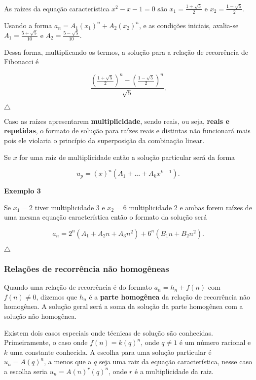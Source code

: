 As raízes da equação característica $x^2 - x - 1 = 0$ são $x_1 = \frac{1+\sqrt{5}}{2}$ e $x_2 = \frac{1 - \sqrt{5}}{2}$.

Usando a forma $a_n = A_1(x_1)^n + A_2(x_2)^n$, e as condições iniciais, avalia-se $A_1 = \frac{5 + \sqrt{5}}{10}$ e $A_2 = \frac{5 - \sqrt{5}}{10}$.

Dessa forma, multiplicando os termos, a solução para a relação de recorrência de Fibonacci é 

\[\frac{(\frac{1+\sqrt{5}}{2})^n-(\frac{1 - \sqrt{5}}{2})^n}{\sqrt{5}}.\]

{\raggedleft $\bigtriangleup$ \par}

Caso as raízes apresentarem \textbf{multiplicidade}, sendo reais, ou seja, \textbf{reais e repetidas}, o formato de solução para raízes reais e distintas não funcionará mais pois ele violaria o princípio da superposição da combinação linear.

Se $x$ for uma raiz de multiplicidade então a solução particular será da forma

\[u_p = (x)^n(A_1 + ... + A_{k}x^{k-1}).\]

\textbf{Exemplo 3}

Se $x_1 = 2$ tiver multiplicidade $3$ e $x_2 = 6$ multiplicidade $2$ e ambas forem raízes de uma mesma equação característica então o formato da solução será

\[a_n = 2^n(A_1 + A_2n + A_3n^2) + 6^n(B_1n + B_2n^2).\]

{\raggedleft $\bigtriangleup$ \par}

\subsubsection{Relações de recorrência não homogêneas}

Quando uma relação de recorrência é do formato $a_n = h_n + f(n)$ com $f(n) \neq 0$, dizemos que $h_n$ é a \textbf{parte homogênea} da relação de recorrência não homogênea. A solução geral será a soma da solução da parte homogênea com a solução não homogênea.

Existem dois casos especiais onde técnicas de solução são conhecidas. Primeiramente, o caso onde $f(n) = k(q)^n$, onde $q \neq 1$ é um número racional e $k$ uma constante conhecida. A escolha para uma solução particular é $u_n = A(q)^n$, a menos que a $q$ seja uma raiz da equação característica, nesse caso a escolha seria $u_n = A(n)^r(q)^n$, onde $r$ é a multiplicidade da raiz.

